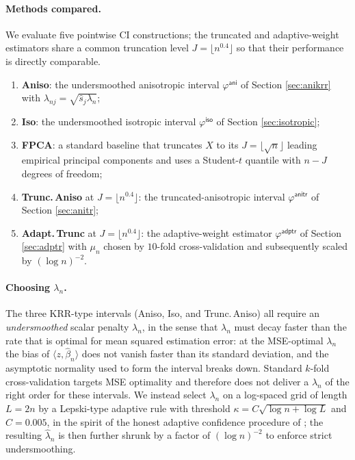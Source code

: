 \documentclass[11pt,a4paper]{article}
\renewcommand{\hat}{\widehat}
\theoremstyle{definition}
\theoremstyle{plain}
\theoremstyle{remark}
\newcommand{\iso}{\mathsf{iso}}
\newcommand{\ani}{\mathsf{ani}}
\newcommand{\anitr}{\mathsf{anitr}}
\newcommand{\adptr}{\mathsf{adptr}}
\begin{document}
\paragraph{Methods compared.}
We evaluate five pointwise CI constructions; the truncated and adaptive-weight estimators share a common truncation level $J=\lfloor n^{0.4}\rfloor$ so that their performance is directly comparable.
\begin{enumerate}[label=(\roman*),leftmargin=2.2em]
\item \textbf{Aniso}: the undersmoothed anisotropic interval $\varphi^{\ani}$ of Section \ref{sec:anikrr} with $\lambda_{nj}=\sqrt{\hat s_j\lambda_n}$;
\item \textbf{Iso}: the undersmoothed isotropic interval $\varphi^{\iso}$ of Section \ref{sec:isotropic};
\item \textbf{FPCA}: a standard baseline that truncates $X$ to its $J=\lfloor\sqrt n\rfloor$ leading empirical principal components and uses a Student-$t$ quantile with $n-J$ degrees of freedom;
\item \textbf{Trunc.\,Aniso} at $J=\lfloor n^{0.4}\rfloor$: the truncated-anisotropic interval $\varphi^{\anitr}$ of Section \ref{sec:anitr};
\item \textbf{Adapt.\,Trunc} at $J=\lfloor n^{0.4}\rfloor$: the adaptive-weight estimator $\varphi^{\adptr}$ of Section \ref{sec:adptr} with $\mu_n$ chosen by $10$-fold cross-validation and subsequently scaled by $(\log n)^{-2}$.
\end{enumerate}
\paragraph{Choosing $\lambda_n$.}
The three KRR-type intervals (Aniso, Iso, and Trunc.\,Aniso) all require an \emph{undersmoothed} scalar penalty $\lambda_n$, in the sense that $\lambda_n$ must decay faster than the rate that is optimal for mean squared estimation error: at the MSE-optimal $\lambda_n$ the bias of $\langle z, \hat\beta_n\rangle$ does not vanish faster than its standard deviation, and the asymptotic normality used to form the interval breaks down. Standard $k$-fold cross-validation targets MSE optimality and therefore does not deliver a $\lambda_n$ of the right order for these intervals. We instead select $\lambda_n$ on a log-spaced grid of length $L=2n$ by a Lepski-type adaptive rule with threshold $\kappa=C\sqrt{\log n+\log L}$ and $C=0.005$, in the spirit of the honest adaptive confidence procedure of \citet{chernozhukov2014anticoncentration}; the resulting $\hat\lambda_n$ is then further shrunk by a factor of $(\log n)^{-2}$ to enforce strict undersmoothing.
\end{document}
